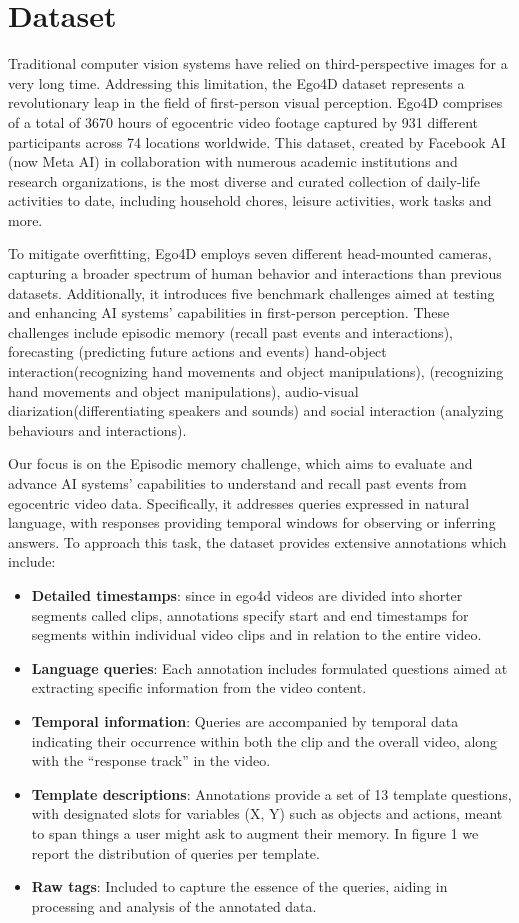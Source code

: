 \documentclass[conference]{IEEEtran}
\begin{document}
\section{Dataset}
Traditional computer vision systems have relied on third-perspective images for a very long time. Addressing this limitation, the Ego4D dataset represents a revolutionary leap in the field of first-person visual perception. Ego4D comprises of a total of 3670 hours of egocentric video footage captured by 931 different participants across 74 locations worldwide. This dataset, created by Facebook AI (now Meta AI) in collaboration with numerous academic institutions and research organizations, is the most diverse and curated collection of daily-life activities to date, including household chores, leisure activities, work tasks and more. 

To mitigate overfitting, Ego4D employs seven different head-mounted cameras, capturing a broader spectrum of human behavior and interactions than previous datasets. Additionally, it introduces five benchmark challenges aimed at testing and enhancing AI systems' capabilities in first-person perception. These challenges include episodic memory (recall past events and interactions), forecasting (predicting future actions and events) hand-object interaction(recognizing hand movements and object manipulations), (recognizing hand movements and object manipulations), audio-visual diarization(differentiating speakers and sounds) and social interaction (analyzing behaviours and interactions). 

Our focus is on the Episodic memory challenge, which aims to evaluate and advance AI systems’ capabilities to understand and recall past events from egocentric video data. Specifically, it addresses queries expressed in natural language, with responses providing temporal windows for observing or inferring answers. To approach this task, the dataset provides extensive annotations which include:

\begin{itemize}
    \item \textbf{Detailed timestamps}: since in ego4d videos are divided into shorter segments called clips, annotations specify start and end timestamps for segments within individual video clips and in relation to the entire video.
    \item \textbf{Language queries}: Each annotation includes formulated questions aimed at extracting specific information from the video content.
    \item \textbf{Temporal information}: Queries are accompanied by temporal data indicating their occurrence within both the clip and the overall video, along with the “response track” in the video.
    \item \textbf{Template descriptions}: Annotations provide a set of 13 template questions, with designated slots for variables (X, Y) such as objects and actions, meant to span things a user might ask to augment their memory. In figure 1 we report the distribution of queries per template.
    \item \textbf{Raw tags}: Included to capture the essence of the queries, aiding in processing and analysis of the annotated data.
\end{itemize}
\end{document}
